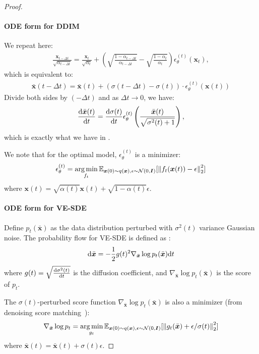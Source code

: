 \begin{proof}
\paragraph{ODE form for DDIM} We repeat  here:
\begin{align}
    \frac{\bm{x}_{t-\Delta t}}{\sqrt{\alpha_{t-\Delta t}}}  = \frac{\bm{x}_t}{\sqrt{\alpha_t}}  + \left(\sqrt{\frac{1 - \alpha_{t-\Delta t}}{\alpha_{t-\Delta t}}} - \sqrt{\frac{1 - \alpha_{t}}{\alpha_t}}\right) \epsilon_\theta^{(t)}(\bm{x}_t),
\end{align}
which is equivalent to:
\begin{align}
    \bar{\bm{x}}(t-\Delta t) = \bar{\bm{x}}(t) + (\sigma(t-\Delta t) - \sigma(t)) \cdot \epsilon_\theta^{(t)}(\bm{x}(t))
\end{align}
Divide both sides by $(-\Delta t)$ and as $\Delta t \to 0$, we have:
\begin{align}
    \frac{\mathrm{d} \bar{\bm{x}}(t)}{\mathrm{d} t} = \frac{\mathrm{d} \sigma(t)}{\mathrm{d} t} \epsilon_\theta^{(t)}\left(\frac{\bar{\bm{x}}(t)}{\sqrt{\sigma^2(t) + 1}}\right), \label{eq:ddim:differential}
\end{align}
which is exactly what we have in . 

We note that for the optimal model, $\epsilon_\theta^{(t)}$ is a minimizer:
\begin{align}
    \epsilon_\theta^{(t)} = \operatorname*{arg\,min}_{f_t} {\mathbb{E}}_{\bm{x}(0) \sim q(\bm{x}), \epsilon \sim \mathcal{N}(0, \bm{I})}[{\lVert {f_t(\bm{x}(t)) - \epsilon} \rVert}_2^2] \label{eq:dsm-ddim}
\end{align}
where $\bm{x}(t) = \sqrt{\alpha(t)} \bm{x}(t) + \sqrt{1 - \alpha(t)} \epsilon$.

\paragraph{ODE form for VE-SDE} Define $p_t(\bar{\bm{x}})$ as the data distribution perturbed with $\sigma^2(t)$ variance Gaussian noise. The probability flow for VE-SDE is defined as \cite{song2020score}:
\begin{align}
    \mathrm{d} \bar{\bm{x}} = -\frac{1}{2} g(t)^2 \nabla_{\bar{\bm{x}}} \log p_t(\bar{\bm{x}}) \mathrm{d} t  \label{eq:yang-ode}
\end{align}
where $g(t) = \sqrt{\frac{\mathrm{d} \sigma^2(t)}{\mathrm{d} t}}$ is the diffusion coefficient, and $\nabla_{\bar{\bm{x}}} \log p_t(\bar{\bm{x}})$ is the score of $p_t$. 

The $\sigma(t)$-perturbed score function $\nabla_{\bar{\bm{x}}} \log p_t(\bar{\bm{x}})$ is also a minimizer (from denoising score matching~\citep{vincent2011connection}):
\begin{align}
    \nabla_{\bar{\bm{x}}} \log p_t = \operatorname*{arg\,min}_{g_t} {\mathbb{E}}_{\bm{x}(0) \sim q(\bm{x}), \epsilon \sim \mathcal{N}(0, \bm{I})}[{\lVert {g_t(\bar{\bm{x}}) + \epsilon / \sigma(t)} \rVert}_2^2] \label{eq:dsm-ve}
\end{align}
where $\bar{\bm{x}}(t) = \bar{\bm{x}}(t) + \sigma(t) \epsilon$. 


\end{proof}
